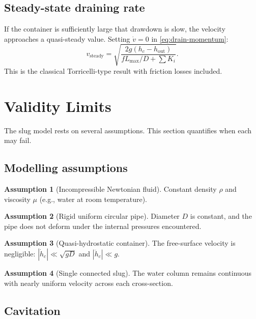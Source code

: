 \documentclass[11pt]{article}
\theoremstyle{definition}
\newtheorem{assumption}{Assumption}[section]
\begin{document}
\subsection{Steady-state draining rate}

If the container is sufficiently large that drawdown is slow, the velocity approaches a 
quasi-steady value. Setting $\dot{v} = 0$ in \eqref{eq:drain-momentum}:
\[
  v_{\text{steady}} = \sqrt{\frac{2g(h_c - h_{\text{out}})}{fL_{\max}/D + \sum K_i}}.
\]
This is the classical Torricelli-type result with friction losses included.

\section{Validity Limits}
\label{sec:validity}

The slug model rests on several assumptions. This section quantifies when each may fail.

\subsection{Modelling assumptions}

\begin{assumption}[Incompressible Newtonian fluid]
Constant density $\rho$ and viscosity $\mu$ (e.g., water at room temperature).
\end{assumption}

\begin{assumption}[Rigid uniform circular pipe]
Diameter $D$ is constant, and the pipe does not deform under the internal pressures 
encountered.
\end{assumption}

\begin{assumption}[Quasi-hydrostatic container]
The free-surface velocity is negligible: $|\dot{h}_c| \ll \sqrt{gD}$ and $|\ddot{h}_c| \ll g$.
\end{assumption}

\begin{assumption}[Single connected slug]
The water column remains continuous with nearly uniform velocity across each cross-section.
\end{assumption}

\subsection{Cavitation}
\end{document}
